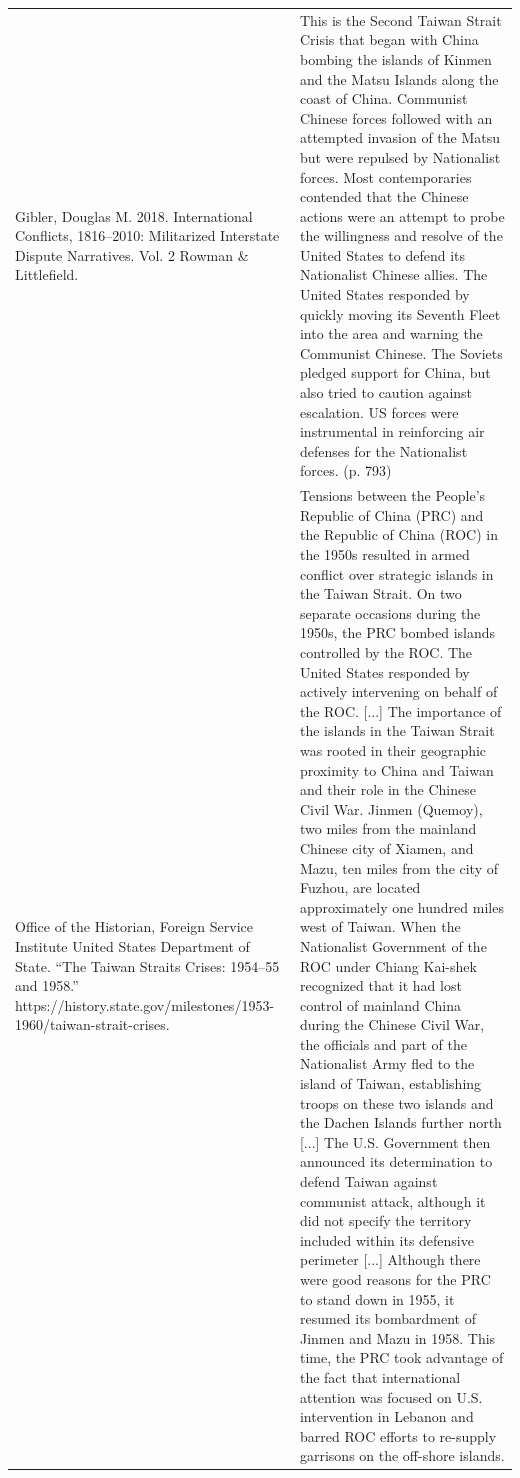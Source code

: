 {\begin{longtable}{p{}p{}}
Gibler, Douglas M. 2018. International Conflicts, 1816–2010: Militarized Interstate Dispute Narratives. Vol. 2 Rowman \& Littlefield. & This is the Second Taiwan Strait Crisis that began with China bombing the islands of Kinmen and the Matsu Islands along the coast of China. Communist Chinese forces followed with an attempted invasion of the Matsu but were repulsed by Nationalist forces. Most contemporaries contended that the Chinese actions were an attempt to probe the willingness and resolve of the United States to defend its Nationalist Chinese allies. The United States responded by quickly moving its Seventh Fleet into the area and warning the Communist Chinese. The Soviets pledged support for China, but also tried to caution against escalation. US forces were instrumental in reinforcing air defenses for the Nationalist forces. (p. 793)
\\
Office of the Historian, Foreign Service Institute United States Department of State. “The Taiwan Straits Crises: 1954–55 and 1958.” https://history.state.gov/milestones/1953-1960/taiwan-strait-crises. & Tensions between the People's Republic of China (PRC) and the Republic of China (ROC) in the 1950s resulted in armed conflict over strategic islands in the Taiwan Strait. On two separate occasions during the 1950s, the PRC bombed islands controlled by the ROC. The United States responded by actively intervening on behalf of the ROC. [...] The importance of the islands in the Taiwan Strait was rooted in their geographic proximity to China and Taiwan and their role in the Chinese Civil War. Jinmen (Quemoy), two miles from the mainland Chinese city of Xiamen, and Mazu, ten miles from the city of Fuzhou, are located approximately one hundred miles west of Taiwan. When the Nationalist Government of the ROC under Chiang Kai-shek recognized that it had lost control of mainland China during the Chinese Civil War, the officials and part of the Nationalist Army fled to the island of Taiwan, establishing troops on these two islands and the Dachen Islands further north [...]  The U.S. Government then announced its determination to defend Taiwan against communist attack, although it did not specify the territory included within its defensive perimeter [...] Although there were good reasons for the PRC to stand down in 1955, it resumed its bombardment of Jinmen and Mazu in 1958. This time, the PRC took advantage of the fact that international attention was focused on U.S. intervention in Lebanon and barred ROC efforts to re-supply garrisons on the off-shore islands.
\\

\end{longtable}}
